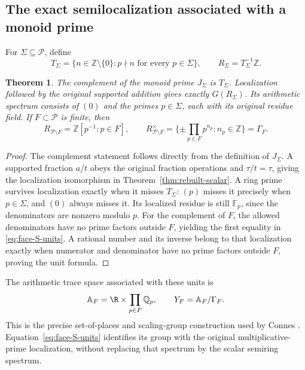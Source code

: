 \documentclass[11pt,a4paper]{article}
\newtheorem{theorem}{Theorem}[section]
\theoremstyle{definition}\newtheorem{definition}[theorem]{Definition}
\newcommand{\Z}{\mathbb Z}\newcommand{\Q}{\mathbb Q}
\newcommand{\F}{\mathbb F}
\begin{document}
\subsection{The exact semilocalization associated with a monoid prime}
For $\Sigma\subseteq\mathcal P$, define
\[
 T_\Sigma=\{n\in\Z\setminus\{0\}:p\nmid n\text{ for every }p\in\Sigma\},
 \qquad R_\Sigma=T_\Sigma^{-1}\Z.
\]
\begin{theorem}\label{thm:face-semilocalization}
The complement of the monoid prime $J_\Sigma$ is $T_\Sigma$. Localization followed by the original supported addition gives exactly $G(R_\Sigma)$. Its arithmetic spectrum consists of $(0)$ and the primes $p\in\Sigma$, each with its original residue field. If $F\subset\mathcal P$ is finite, then
\begin{equation}\label{eq:face-S-units}
 R_{\mathcal P\setminus F}=\Z[p^{-1}:p\in F],\qquad
 R_{\mathcal P\setminus F}^{\times}
 =\{\pm\prod_{p\in F}p^{n_p}:n_p\in\Z\}=\Gamma_F.
\end{equation}
\end{theorem}
\begin{proof}
The complement statement follows directly from the definition of $J_\Sigma$. A supported fraction $a/t$ obeys the original fraction operations and $\tau/t=\tau$, giving the localization isomorphism in Theorem~\ref{thm:rebuilt-scalar}. A ring prime survives localization exactly when it misses $T_\Sigma$: $(p)$ misses it precisely when $p\in\Sigma$, and $(0)$ always misses it. Its localized residue is still $\F_p$, since the denominators are nonzero modulo $p$. For the complement of $F$, the allowed denominators have no prime factors outside $F$, yielding the first equality in \eqref{eq:face-S-units}. A rational number and its inverse belong to that localization exactly when numerator and denominator have no prime factors outside $F$, proving the unit formula.
\end{proof}
The arithmetic trace space associated with these units is
\[
 \mathbb A_F=\R\times\prod_{p\in F}\Q_p,\qquad
 Y_F=\mathbb A_F/\Gamma_F.
\]
This is the precise set-of-places and scaling-group construction used by Connes \cite[labels \texttt{YQS}, \texttt{GL1QS}]{Connes2026}. Equation~\eqref{eq:face-S-units} identifies its group with the original multiplicative-prime localization, without replacing that spectrum by the scalar semiring spectrum.
\end{document}
